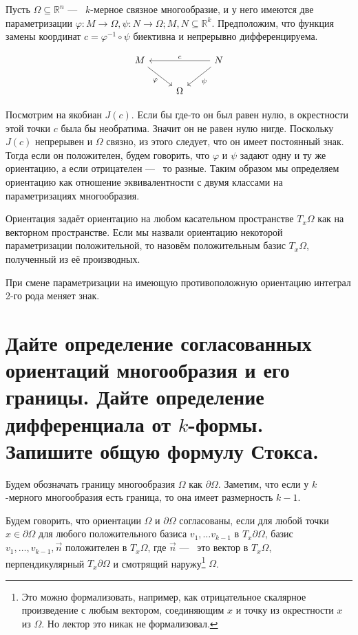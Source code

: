 \documentclass{article}
\begin{document}
	Пусть $\Omega \subseteq \mathbb{R}^n$ ---~ $k$-мерное связное многообразие, и у него имеются две параметризации $\varphi: M \to \Omega, \psi: N \to \Omega; M, N \subseteq \mathbb{R}^k$. Предположим, что функция замены координат $c = \varphi^{-1} \circ \psi$ биективна и непрерывно дифференцируема.

	\[ \begin{tikzcd}
		M \arrow[swap]{rd}{\varphi} &  &\arrow[swap]{ll}{c} N \arrow{ld}{\psi} \\
		& \Omega 
	\end{tikzcd} \]

	Посмотрим на якобиан $J(c)$. Если бы где-то он был равен нулю, в окрестности этой точки $c$ была бы необратима. Значит он не равен нулю нигде. Поскольку $J(c)$ непрерывен и $\Omega$ связно, из этого следует, что он имеет постоянный знак. Тогда если он положителен, будем говорить, что $\varphi$ и $\psi$ задают одну и ту же ориентацию, а если отрицателен ---~ то разные. Таким образом мы определяем ориентацию как отношение эквивалентности с двумя классами на параметризациях многообразия.

	Ориентация задаёт ориентацию на любом касательном пространстве $T_{x}\Omega$ как на векторном пространстве. Если мы назвали ориентацию некоторой параметризации положительной, то назовём положительным базис $T_x \Omega$, полученный из её производных.

	При смене параметризации на имеющую противоположную ориентацию интеграл 2-го рода меняет знак. 

	\section{Дайте определение согласованных ориентаций многообразия и его границы. Дайте определение дифференциала от $k$-формы. Запишите общую формулу Стокса.}
	Будем обозначать границу многообразия $\Omega$ как $\partial \Omega$. Заметим, что если у $k$-мерного многообразия есть граница, то она имеет размерность $k - 1$.

	\begin{definition}
		Будем говорить, что ориентации $\Omega$ и $\partial \Omega$ согласованы, если для любой точки $x \in \partial \Omega$ для любого положительного базиса $v_1, \ldots v_{k - 1}$ в $T_x \partial \Omega$, базис $v_1, \ldots, v_{k - 1}, \vec{n}$ положителен в $T_x \Omega$, где $\vec{n}$ ---~ это вектор в $T_x \Omega$, перпендикулярный $T_x \partial \Omega$ и смотрящий наружу\footnote{Это можно формализовать, например, как отрицательное скалярное произведение с любым вектором, соединяющим $x$ и точку из окрестности $x$ из $\Omega$. Но лектор это никак не формализовал.} $\Omega$.
	\end{definition}
\end{document}
